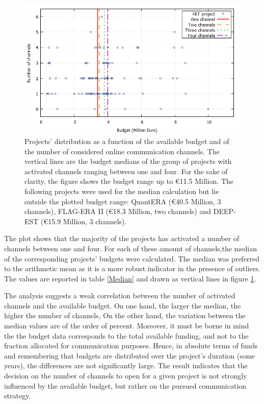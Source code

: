 \begin{figure}[!t] 
 \begin{center}
 \includegraphics[scale=0.4]{Images/Channel_budget.png}
 \caption{Projects' distribution as a function of the available budget and of the number of considered online communication channels. The vertical lines are the budget medians of the group of projects with activated channels ranging between one and four. For the sake of clarity, the figure shows the budget range up to \euro 11.5 Million. The following projects were used for the median calculation but lie outside the plotted budget range: QuantERA (\euro 40.5 Million, 3 channels), FLAG-ERA II (\euro 18.3 Million, two channels) and DEEP-EST (\euro 15.9 Million, 3 channels).}
 \label{Channel_budget}
 \end{center}
\end{figure}

The plot shows that the majority of the projects has activated a number of channels between one and four. For each of these amount of channels,the median of the corresponding projects' budgets were calculated. The median was preferred to the arithmetic mean as it is a more robust indicator in the presence of outliers. The values are reported in table \ref{Median} and drawn as vertical lines in figure \ref{Channel_budget}. 

The analysis suggests a weak correlation between the number of activated channels and the available budget. On one hand, the larger the median, the higher the number of channels, On the other hand, the variation between the median values are of the order of percent. Moreover, it must be borne in mind the the budget data corresponds to the total available funding, and not to the fraction allocated for communication purposes. Hence, in absolute terms of funds and remembering that budgets are  distributed over the project's duration (some years), the differences are not significantly large. The result indicates that the decision on the number of channels to open for a given project is not strongly influenced by the available budget, but rather on the pursued communication strategy. 

